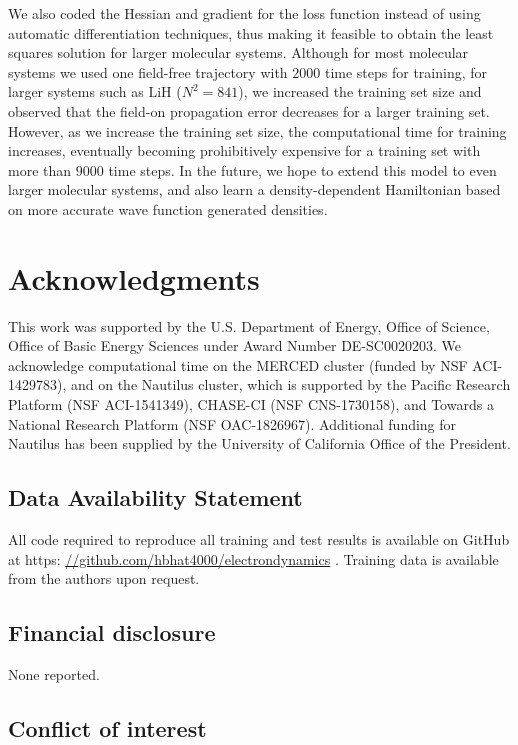 \documentclass[10pt]{article}
\newcommand{\lih}{\ensuremath{\text{LiH}} }
\begin{document}
We also coded the Hessian and gradient for the loss function instead of using automatic differentiation techniques, thus making it feasible to obtain the least squares solution for larger molecular systems. Although for most molecular systems we used one field-free trajectory with $2000$ time steps for training, for larger systems such as \lih ($N^2 = 841$), we increased the training set size and observed that the field-on propagation error decreases for a larger training set. However, as we increase the training set size, the computational time for training increases, eventually becoming prohibitively expensive for a training set with more than $9000$ time steps.  In the future, we hope to extend this model to even larger molecular systems, and also learn a density-dependent Hamiltonian based on more accurate wave function generated densities.

\section*{Acknowledgments}
This work was supported by the U.S. Department of Energy, Office of Science, Office of Basic Energy Sciences under Award Number DE-SC0020203.  We acknowledge computational time on the MERCED cluster (funded by NSF ACI-1429783), and on the Nautilus cluster, which is supported by the Pacific Research Platform (NSF ACI-1541349), CHASE-CI (NSF CNS-1730158), and Towards a National Research Platform (NSF OAC-1826967). Additional funding for Nautilus has been supplied by the University of California Office of the President.

\subsection*{Data Availability Statement}

All code required to reproduce all training and test results is available on GitHub at https:
\url{//github.com/hbhat4000/electrondynamics} \cite{BhatGitRepo}. Training data is available from the authors upon request.

\subsection*{Financial disclosure}

None reported.

\subsection*{Conflict of interest}
\end{document}
